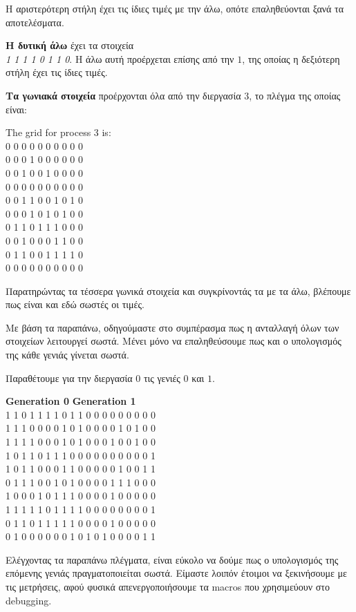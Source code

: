 \begin{multicols}{2}
Η αριστερότερη στήλη έχει τις ίδιες τιμές με την άλω, οπότε επαληθεύονται ξανά τα αποτελέσματα. \par

\textbf{Η δυτική άλω} έχει τα στοιχεία \\ \emph{1 1 1 1 0 1 1 0}. Η άλω αυτή προέρχεται επίσης από την $1$, της οποίας η δεξιότερη στήλη έχει τις ίδιες τιμές. \par
\textbf{Τα γωνιακά στοιχεία} προέρχονται όλα από την διεργασία $3$, το πλέγμα της οποίας είναι:

\begin{tcolorbox}
The grid for process 3 is: \\
0 0 0 0 0 0 0 0 0 0 \\
0 0 0 1 0 0 0 0 0 0 \\
0 0 1 0 0 1 0 0 0 0 \\
0 0 0 0 0 0 0 0 0 0 \\
0 0 1 1 0 0 1 0 1 0 \\
0 0 0 1 0 1 0 1 0 0 \\
0 1 1 0 1 1 1 0 0 0 \\
0 0 1 0 0 0 1 1 0 0 \\
0 1 1 0 0 1 1 1 1 0 \\
0 0 0 0 0 0 0 0 0 0 \\
\end{tcolorbox}
Παρατηρώντας τα τέσσερα γωνικά στοιχεία και συγκρίνοντάς τα με τα άλω, βλέπουμε πως είναι και εδώ σωστές οι τιμές. \par
Με βάση τα παραπάνω, οδηγούμαστε στο συμπέρασμα πως η ανταλλαγή όλων των στοιχείων λειτουργεί σωστά. Μένει μόνο να επαληθεύσουμε πως και ο υπολογισμός της κάθε γενιάς γίνεται σωστά. \par
Παραθέτουμε για την διεργασία $0$ τις γενιές $0$ και $1$.

\begin{tcolorbox}[left=2pt,right=2pt]
\centering
\textbf{Generation 0} \quad \textbf{Generation 1} \\
1 1 0 1 1 1 1 0 1 1  0 0 0 0 0 0 0 0 0 \\
1 1 1 0 0 0 0 1 0 1  0 0 0 0 1 0 1 0 0 \\
1 1 1 1 0 0 0 1 0 1  0 0 0 1 0 0 1 0 0 \\
1 0 1 1 0 1 1 1 0 0  0 0 0 0 0 0 0 0 1 \\
1 0 1 1 0 0 0 1 1 0  0 0 0 0 1 0 0 1 1 \\
0 1 1 1 0 0 1 0 1 0  0 0 0 1 1 1 0 0 0 \\
1 0 0 0 1 0 1 1 1 0  0 0 0 1 0 0 0 0 0 \\
1 1 1 1 1 0 1 1 1 1  0 0 0 0 0 0 0 0 1 \\
0 1 1 0 1 1 1 1 1 0  0 0 0 1 0 0 0 0 0 \\
0 1 0 0 0 0 0 0 1 0  1 0 1 0 0 0 0 1 1 \\
\end{tcolorbox}

Ελέγχοντας τα παραπάνω πλέγματα, είναι εύκολο να δούμε πως ο υπολογισμός της επόμενης γενιάς πραγματοποιείται σωστά. Είμαστε λοιπόν έτοιμοι να ξεκινήσουμε με τις μετρήσεις, αφού φυσικά απενεργοποιήσουμε τα macros που χρησιμεύουν στο debugging.
\end{multicols}